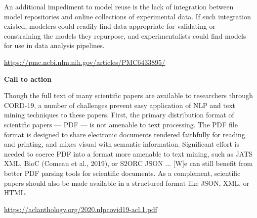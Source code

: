 \documentclass[11pt]{article}
\begin{document}
{\begin{blockQuote}
\pseudoIndent{} An additional impediment to model reuse is the lack of integration between model repositories and online collections of experimental data. If such integration existed, modelers could readily find data appropriate for validating or constraining the models they repurpose, and experimentalists could find models for use in data analysis pipelines. 
\end{blockQuote}

\vspace*{5pt}
\hfill{}

\hfill\href{https://pmc.ncbi.nlm.nih.gov/articles/PMC6433895/}{https://pmc.ncbi.nlm.nih.gov/articles/PMC6433895/}

\vspace*{9pt}


\begin{blockQuote}

\textbf{Call to action}

\vspace*{4pt}

Though the full text of many scientific papers are
available to researchers through CORD-19, a number of 
challenges prevent easy application of NLP
and text mining techniques to these papers. First,
the primary distribution format of scientific papers
--- PDF --- is not amenable to text processing. The
PDF file format is designed to share electronic documents rendered faithfully for reading and printing, and mixes visual with semantic information.
Significant effort is needed to coerce PDF into a
format more amenable to text mining, such as JATS
XML, BioC (Comeau et al., 2019), or S2ORC
JSON ... [W]e can still benefit from better PDF parsing tools
for scientific documents. As a complement, 
scientific papers should also be made available in a
structured format like JSON, XML, or HTML.
\end{blockQuote}

\vspace{-4pt}
\hfill{}

\hfill\href{https://aclanthology.org/2020.nlpcovid19-acl.1.pdf}{https://aclanthology.org/2020.nlpcovid19-acl.1.pdf}

\vspace{3pt}




}
\end{document}
